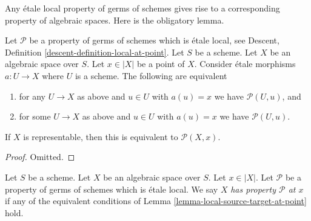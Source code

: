\noindent
Any \'etale local property of germs of schemes gives rise to a corresponding
property of algebraic spaces. Here is the obligatory lemma.

\begin{lemma}
\label{lemma-local-source-target-at-point}
Let $\mathcal{P}$ be a property of germs of schemes which is \'etale local, see
Descent, Definition \ref{descent-definition-local-at-point}.
Let $S$ be a scheme.
Let $X$ be an algebraic space over $S$.
Let $x \in |X|$ be a point of $X$.
Consider \'etale morphisms $a : U \to X$ where $U$ is a scheme.
The following are equivalent
\begin{enumerate}
\item for any $U \to X$ as above and $u \in U$ with $a(u) = x$ we have
$\mathcal{P}(U, u)$, and
\item for some $U \to X$ as above and $u \in U$ with $a(u) = x$ we have
$\mathcal{P}(U, u)$.
\end{enumerate}
If $X$ is representable, then this is equivalent to $\mathcal{P}(X, x)$.
\end{lemma}

\begin{proof}
Omitted.
\end{proof}

\begin{definition}
\label{definition-property-at-point}
Let $S$ be a scheme. Let $X$ be an algebraic space over $S$.
Let $x \in |X|$. Let $\mathcal{P}$ be a property of germs of schemes which is
\'etale local.
We say $X$ {\it has property $\mathcal{P}$ at $x$} if any of the
equivalent conditions of
Lemma \ref{lemma-local-source-target-at-point}
hold.
\end{definition}

